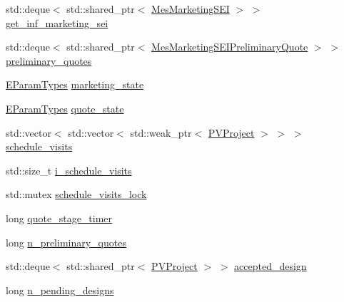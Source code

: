 {\bf }\par
\begin{DoxyCompactItemize}
\item 
std\+::deque$<$ std\+::shared\+\_\+ptr$<$ \hyperlink{classsolar__core_1_1_mes_marketing_s_e_i}{Mes\+Marketing\+S\+E\+I} $>$ $>$ \hyperlink{classsolar__core_1_1_household_a3ae4cec5fca43ee5ca3287a01f5a05a2}{get\+\_\+inf\+\_\+marketing\+\_\+sei}
\item 
std\+::deque$<$ std\+::shared\+\_\+ptr$<$ \hyperlink{classsolar__core_1_1_mes_marketing_s_e_i_preliminary_quote}{Mes\+Marketing\+S\+E\+I\+Preliminary\+Quote} $>$ $>$ \hyperlink{classsolar__core_1_1_household_a297842358a2d79db160566106972bc0d}{preliminary\+\_\+quotes}
\item 
\hyperlink{namespacesolar__core_aa1147341e5ef7a40d68d1bd68e149362}{E\+Param\+Types} \hyperlink{classsolar__core_1_1_household_a3ee8b2654cad46236d11f85a4ccd9574}{marketing\+\_\+state}
\end{DoxyCompactItemize}

{\bf }\par
\begin{DoxyCompactItemize}
\item 
\hyperlink{namespacesolar__core_aa1147341e5ef7a40d68d1bd68e149362}{E\+Param\+Types} \hyperlink{classsolar__core_1_1_household_a4ae618de9a28895317824b185b57ab24}{quote\+\_\+state}
\item 
std\+::vector$<$ std\+::vector$<$ std\+::weak\+\_\+ptr$<$ \hyperlink{classsolar__core_1_1_p_v_project}{P\+V\+Project} $>$ $>$ $>$ \hyperlink{classsolar__core_1_1_household_aadd4e3e2fc66ed214bcfadf37f557b14}{schedule\+\_\+visits}
\item 
std\+::size\+\_\+t \hyperlink{classsolar__core_1_1_household_a077c668f06c009a43c535f1ad92cf92e}{i\+\_\+schedule\+\_\+visits}
\item 
std\+::mutex \hyperlink{classsolar__core_1_1_household_a15e598cfc419040a23f75fe08a8ef1d8}{schedule\+\_\+visits\+\_\+lock}
\item 
long \hyperlink{classsolar__core_1_1_household_a6b35426fd691daa6d352ec34a6ec6e4d}{quote\+\_\+stage\+\_\+timer}
\item 
long \hyperlink{classsolar__core_1_1_household_aedfc08b7837a3e2fa6ad9e62309694f3}{n\+\_\+preliminary\+\_\+quotes}
\end{DoxyCompactItemize}

{\bf }\par
\begin{DoxyCompactItemize}
\item 
std\+::deque$<$ std\+::shared\+\_\+ptr$<$ \hyperlink{classsolar__core_1_1_p_v_project}{P\+V\+Project} $>$ $>$ \hyperlink{classsolar__core_1_1_household_ad4409e81251bdd33d9dca1cd1225dc75}{accepted\+\_\+design}
\item 
long \hyperlink{classsolar__core_1_1_household_ac82a6ebca38ecaf971845f6fa5791559}{n\+\_\+pending\+\_\+designs}
\end{DoxyCompactItemize}

